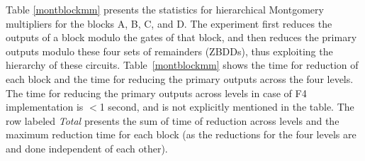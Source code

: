 \par Table \ref{montblockmm} presents the
statistics for hierarchical Montgomery multipliers for the blocks A,
B, C, and D. The experiment first reduces the outputs of a block
modulo the gates of that block, and then reduces the primary outputs
modulo these four sets of remainders (ZBDDs), thus exploiting the
hierarchy of these circuits. Table~\ref{montblockmm} shows the time
for reduction of each block and the time for reducing the primary
outputs across the four levels. The  time for reducing the primary
outputs across  levels in case of F4 implementation is $<$1 second,
and is not explicitly mentioned in the table. The row labeled
\textit{Total} presents the sum of time of reduction across levels and
the maximum reduction time for each block (as the reductions for the
four levels are and done independent of each other). 

